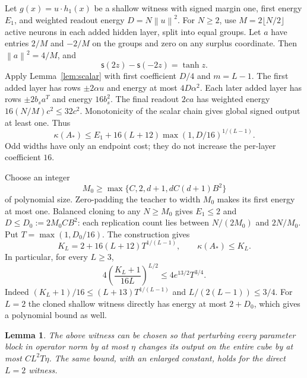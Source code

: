 \documentclass[11pt]{article}
\newtheorem{lemma}[theorem]{Lemma}
\theoremstyle{remark}\newtheorem{remark}[theorem]{Remark}
\newcommand{\norm}[1]{\left\lVert #1\right\rVert}
\newcommand{\sig}{\mathsf s}
\begin{document}
Let $g(x)=u\cdot h_1(x)$ be a shallow witness with signed margin one,
first energy $E_1$, and weighted readout energy $D=N\norm u^2$.
For $N\ge2$, use $M=2\lfloor N/2\rfloor$ active neurons in each added
hidden layer, split into equal groups. Let $a$ have entries $2/M$ and
$-2/M$ on the groups and zero on any surplus coordinate. Then
$\norm a^2=4/M$, and
\[
 \sig(2z)-\sig(-2z)=\tanh z.
\]
Apply Lemma~\ref{lem:scalar} with first coefficient $D/4$ and $m=L-1$.
The first added layer has rows $\pm2\alpha u$ and energy at most
$4D\alpha^2$. Each later added layer has rows $\pm2b_s a^T$ and energy
$16b_s^2$. The final readout $2ca$ has weighted energy
$16(N/M)c^2\le32c^2$. Monotonicity of the scalar chain gives global
signed output at least one. Thus
\begin{equation}\label{eq:wire}
 \kappa(A_*)\le E_1+16(L+12)\max(1,D/16)^{1/(L-1)}.
\end{equation}
Odd widths have only an endpoint cost; they do not increase the per-layer
coefficient $16$.

Choose an integer
\[
 M_0\ge\max\{C,2,d+1,dC(d+1)B^2\}
\]
of polynomial size. Zero-padding the teacher to width $M_0$ makes its
first energy at most one. Balanced cloning to any $N\ge M_0$ gives
$E_1\le2$ and $D\le D_0:=2M_0CB^2$: each replication count lies between
$N/(2M_0)$ and $2N/M_0$. Put $T=\max(1,D_0/16)$. The construction gives
\begin{equation}\label{eq:K}
 K_L=2+16(L+12)T^{1/(L-1)},\qquad \kappa(A_*)\le K_L.
\end{equation}
In particular, for every $L\ge3$,
\begin{equation}\label{eq:P}
 4\left(\frac{K_L+1}{16L}\right)^{L/2}
 \le4e^{13/2}T^{3/4}.
\end{equation}
Indeed $(K_L+1)/16\le(L+13)T^{1/(L-1)}$ and
$L/(2(L-1))\le3/4$. For $L=2$ the cloned shallow witness directly has
energy at most $2+D_0$, which gives a polynomial bound as well.

\begin{lemma}\label{lem:stable}
The above witness can be chosen so that perturbing every parameter block
in operator norm by at most $\eta$ changes its output on the entire cube
by at most $C L^2T\eta$. The same bound, with an enlarged constant,
holds for the direct $L=2$ witness.
\end{lemma}
\end{document}
